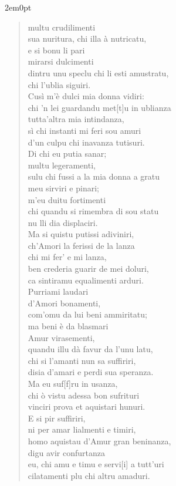 \begin{adjustwidth}{2em}{0pt}
\begin{verse}
multu crudilimenti\\
sua nuritura, chi illa à nutricatu,\\
e si bonu li pari\\
mirarsi dulcimenti\\
dintru unu speclu chi li esti amustratu,\\
chi l'ublia siguiri.\\
Cusì m'è dulci mia donna vidiri:\\
chi 'n lei guardandu met[t]u in ublianza\\
tutta'altra mia intindanza,\\
sì chi instanti mi feri sou amuri\\
d'un culpu chi inavanza tutisuri.\\
Di chi eu putia sanar;\\
multu legeramenti,\\
sulu chi fussi a la mia donna a gratu\\
meu sirviri e pinari;\\
m'eu duitu fortimenti\\
chi quandu si rimembra di sou statu\\
nu lli dia displaciri.\\
Ma si quistu putissi adiviniri,\\
ch'Amori la ferissi de la lanza\\
chi mi fer' e mi lanza,\\
ben crederia guarir de mei doluri,\\
ca sintiramu equalimenti arduri.\\
Purriami laudari\\
d'Amori bonamenti,\\
com'omu da lui beni ammiritatu;\\
ma beni è da blasmari\\
Amur virasementi,\\
quandu illu dà favur da l'unu latu,\\
chi si l'amanti nun sa suffiriri,\\
disia d'amari e perdi sua speranza.\\
Ma eu suf[f]ru in usanza,\\
chi ò vistu adessa bon sufrituri\\
vinciri prova et aquistari hunuri.\\
E si pir suffiriri,\\
ni per amar lialmenti e timiri,\\
homo aquistau d'Amur gran beninanza,\\
digu avir confurtanza\\
eu, chi amu e timu e servi[i] a tutt'uri\\
cilatamenti plu chi altru amaduri.\\
\end{verse}
\end{adjustwidth}


